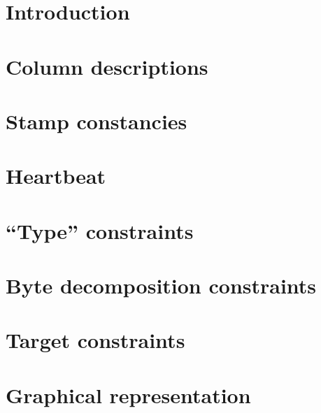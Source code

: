 \section{Introduction}                     \label{alu: add: intro}                     
\section{Column descriptions}              \label{alu: add: columns}                   
\section{Stamp constancies}                \label{alu: add: constancies}               
\section{Heartbeat}                        \label{alu: add: heartbeat}                 
\section{``Type'' constraints}             \label{alu: add: type}                      
\section{Byte decomposition constraints}   \label{alu: add: byte decompositions}       
\section{Target constraints}               \label{alu: add: target}                    
\section{Graphical representation}         \label{alu: add: representation}            
